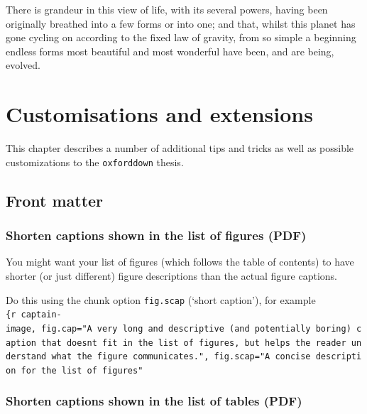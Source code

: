 \documentclass[a4paper, nobind]{templates/ociamthesis}
\begin{document}
\begin{savequote}
There is grandeur in this view of life, with its several powers, having
been originally breathed into a few forms or into one; and that, whilst
this planet has gone cycling on according to the fixed law of gravity,
from so simple a beginning endless forms most beautiful and most
wonderful have been, and are being, evolved.
\end{savequote}



\hypertarget{customisations-and-extensions}{%
\chapter{Customisations and extensions}\label{customisations-and-extensions}}

\minitoc 

\noindent This chapter describes a number of additional tips and tricks as well as possible customizations to the \texttt{oxforddown} thesis.

\hypertarget{front-matter}{%
\section{Front matter}\label{front-matter}}

\hypertarget{shorten-captions-shown-in-the-list-of-figures-pdf}{%
\subsection{Shorten captions shown in the list of figures (PDF)}\label{shorten-captions-shown-in-the-list-of-figures-pdf}}

You might want your list of figures (which follows the table of contents) to have shorter (or just different) figure descriptions than the actual figure captions.

Do this using the chunk option \texttt{fig.scap} (`short caption'), for example \texttt{\{r\ captain-image,\ fig.cap="A\ very\ long\ and\ descriptive\ (and\ potentially\ boring)\ caption\ that\ doesn\textquotesingle{}t\ fit\ in\ the\ list\ of\ figures,\ but\ helps\ the\ reader\ understand\ what\ the\ figure\ communicates.",\ fig.scap="A\ concise\ description\ for\ the\ list\ of\ figures"}

\hypertarget{shorten-captions-shown-in-the-list-of-tables-pdf}{%
\subsection{Shorten captions shown in the list of tables (PDF)}\label{shorten-captions-shown-in-the-list-of-tables-pdf}}
\end{document}
